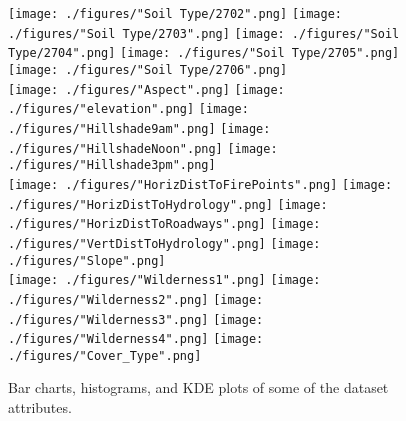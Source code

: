 \documentclass[10pt, conference, compsocconf]{IEEEtran}
\begin{document}
\begin{figure*}[!]
	\vspace{-4mm}
	\centering
	\texttt{[image: ./figures/"Soil Type/2702".png]}
	\texttt{[image: ./figures/"Soil Type/2703".png]}
	\texttt{[image: ./figures/"Soil Type/2704".png]}
	\texttt{[image: ./figures/"Soil Type/2705".png]}
	\texttt{[image: ./figures/"Soil Type/2706".png]}\\
	
	\centering	
	\texttt{[image: ./figures/"Aspect".png]}
	\texttt{[image: ./figures/"elevation".png]}
	\texttt{[image: ./figures/"Hillshade9am".png]}
	\texttt{[image: ./figures/"HillshadeNoon".png]}
	\texttt{[image: ./figures/"Hillshade3pm".png]}\\
	
	\centering
	\texttt{[image: ./figures/"HorizDistToFirePoints".png]}
	\texttt{[image: ./figures/"HorizDistToHydrology".png]}
	\texttt{[image: ./figures/"HorizDistToRoadways".png]}
	\texttt{[image: ./figures/"VertDistToHydrology".png]}
	\texttt{[image: ./figures/"Slope".png]}\\
	
	\centering
	\texttt{[image: ./figures/"Wilderness1".png]}
	\texttt{[image: ./figures/"Wilderness2".png]}
	\texttt{[image: ./figures/"Wilderness3".png]}
	\texttt{[image: ./figures/"Wilderness4".png]}
	\texttt{[image: ./figures/"Cover\_Type".png]}\\
	
	\caption{Bar charts, histograms, and KDE plots of some of the dataset attributes.}
	\label{fig2}
	\vspace{-4mm}
\end{figure*}
\end{document}
